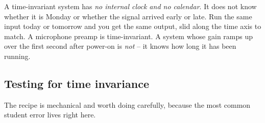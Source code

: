\begin{intuitionbox}
A time-invariant system has \emph{no internal clock and no calendar}. It does not
know whether it is Monday or whether the signal arrived early or late. Run the
same input today or tomorrow and you get the same output, slid along the
time axis to match. A microphone preamp is time-invariant. A system whose gain
ramps up over the first second after power-on is \emph{not} -- it knows how long
it has been running.
\end{intuitionbox}

\subsection*{Testing for time invariance}

The recipe is mechanical and worth doing carefully, because the most common
student error lives right here.

